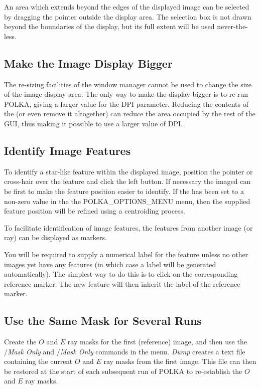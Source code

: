 An area which extends beyond the edges of the displayed image can be
selected by dragging the pointer outside the display area. The selection
box is not drawn beyond the boundaries of the display, but its full extent
will be used never-the-less.

\subsection {Make the Image Display Bigger}
The re-sizing facilities of the window manager cannot be used to change
the size of the image display area. The only way to make the display
bigger is to re-run POLKA, giving a larger value for the
 DPI parameter. Reducing the contents of the
 (or even remove it altogether)
can reduce the area occupied by the rest of the GUI, thus making it
possible to use a larger value of DPI.

\subsection {Identify Image Features}
To identify a star-like feature within the displayed image, position the
pointer or cross-hair over the feature and click the left button. If
necessary the imaged can be  first to make the
feature position easier to identify. If the  has been set to a non-zero value in the
the  {POLKA_OPTIONS_MENU} menu, then the supplied
feature position will be refined using a centroiding process.

To facilitate identification of image features, the features from another
image (or ray) can be displayed as 
markers. 

You will be required to supply a numerical label for the feature unless
no other images yet have any features (in which case a label will be
generated automatically). The simplest way to do this is to click on 
the corresponding reference marker. The new feature will then inherit the
label of the reference marker.

\subsection {Use the Same Mask for Several Runs}
Create the $O$ and $E$ ray masks for the first (reference) image, and
then use the /{\em Mask Only} and
/{\em Mask Only} commands in the
 menu. {\em Dump} creates a text file
containing the current $O$ and $E$ ray masks from the first image. This
file can then be restored at the start of each subsequent run of POLKA to
re-establish the $O$ and $E$ ray masks.

